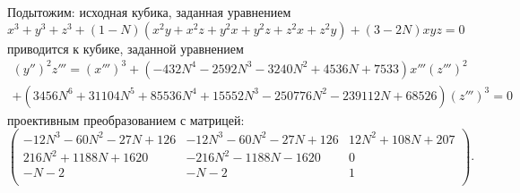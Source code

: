 \bigskip
\bigskip

\noindent Подытожим: исходная кубика, заданная уравнением
\[
x^3 + y^3 + z^3 + (1 - N) (x^2 y + x^2 z + y^2 x + y^2 z + z^2 x + z^2 y) +
(3 - 2 N) x y z = 0
\] 
приводится к кубике, заданной уравнением
\begin{multline*}
    \left( y'' \right)^2 z''' = \left( x''' \right)^3  +  \left(-432 N^4
    - 2592 N^3 - 3240 N^2 + 4536 N + 7533\right) x''' \left( z'''
    \right)^2 \\ 
    +  \left(3456 N^6 + 31104 N^5 + 85536 N^4 + 15552 N^3 -
    250776 N^2 - 239112 N + 68526 \right) \left( z''' \right)^3 = 0
\end{multline*}
проективным преобразованием с матрицей:
\[
\begin{pmatrix}
    -12 N^3 - 60 N^2 - 27 N + 126 &  -12 N^3 - 60 N^2 - 27 N + 126 &
    12 N^2 + 108 N + 207 \\
    216 N^2 + 1188 N + 1620 &  -216 N^2 - 1188 N - 1620 & 0 \\
    -N - 2 &  -N - 2 & 1 \\
\end{pmatrix}
.\] 


